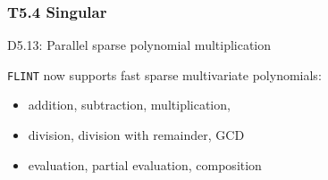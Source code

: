 \documentclass{beamer}
\begin{document}


\begin{frame}
  \frametitle{T5.4 Singular}
  \begin{block}
    {D5.13: Parallel sparse polynomial multiplication}
    
    \texttt{FLINT} now supports fast sparse multivariate polynomials:
    \begin{itemize}
    \item addition, subtraction, multiplication,
    \item division, division with remainder, GCD
    \item evaluation, partial evaluation, composition
    \end{itemize}

\end{block}
\end{frame}
\end{document}
